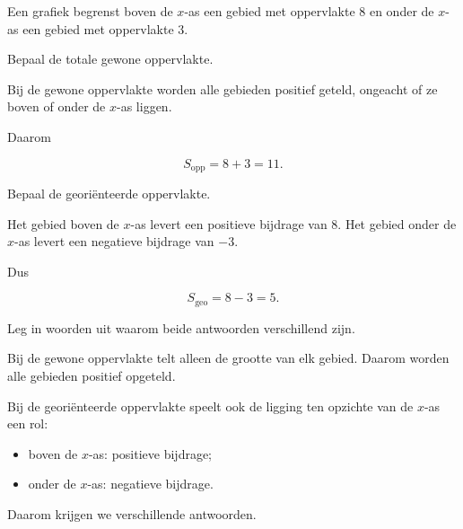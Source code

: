 \documentclass{ximera}
\begin{document}

\begin{oefening}{\oefB\ESS}

Een grafiek begrenst boven de \(x\)-as een gebied met oppervlakte \(8\)
en onder de \(x\)-as een gebied met oppervlakte \(3\).

\begin{question}
Bepaal de totale gewone oppervlakte.

\begin{oplossing}

Bij de gewone oppervlakte worden alle gebieden positief geteld,
ongeacht of ze boven of onder de \(x\)-as liggen.

Daarom

\[
S_{\mathrm{opp}}
=
8+3
=
\boxed{11}.
\]

\end{oplossing}
\end{question}

\begin{question}
Bepaal de georiënteerde oppervlakte.

\begin{oplossing}

Het gebied boven de \(x\)-as levert een positieve bijdrage van \(8\).
Het gebied onder de \(x\)-as levert een negatieve bijdrage van \(-3\).

Dus

\[
S_{\mathrm{geo}}
=
8-3
=
\boxed{5}.
\]

\end{oplossing}
\end{question}

\begin{question}
Leg in woorden uit waarom beide antwoorden verschillend zijn.

\begin{oplossing}

Bij de gewone oppervlakte telt alleen de grootte van elk gebied. Daarom
worden alle gebieden positief opgeteld.

Bij de georiënteerde oppervlakte speelt ook de ligging ten opzichte van
de \(x\)-as een rol:

\begin{itemize}
    \item boven de \(x\)-as: positieve bijdrage;
    \item onder de \(x\)-as: negatieve bijdrage.
\end{itemize}

Daarom krijgen we verschillende antwoorden.

\end{oplossing}
\end{question}

\end{oefening}
\end{document}
